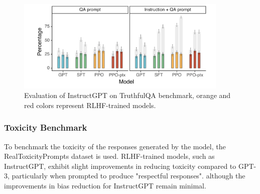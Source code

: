 \begin{figure}[h]
    \centering
    \includegraphics[width=0.9\textwidth]{figures/truthfullnes_image.png}
    \caption{Evaluation of InstructGPT on TruthfulQA benchmark, orange and red colors represent RLHF-trained models.}
    \label{fig:truthfulqa-INSTRUCTGPT}
\end{figure}


\subsubsection{Toxicity Benchmark}

To benchmark the toxicity of the responses generated by the model, the RealToxicityPrompts dataset \cite{gehmanRealToxicityPromptsEvaluatingNeural2020} is used. RLHF-trained models, such as InstructGPT, exhibit slight improvements in reducing toxicity compared to GPT-3, particularly when prompted to produce "respectful responses".
although the improvements in bias reduction for InstructGPT remain minimal.